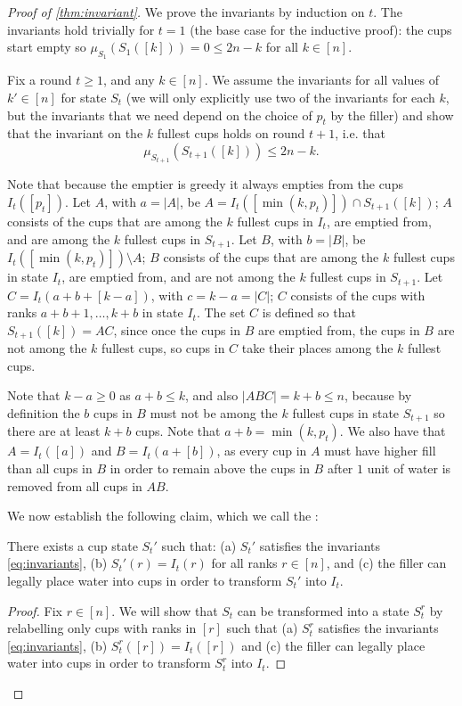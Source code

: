 \begin{proof}[Proof of \cref{thm:invariant}]
We prove the invariants by induction on $t$.
The invariants hold trivially for $t=1$ (the base case for the inductive proof): 
the cups start empty so $\mu_{S_1}(S_1([k])) = 0 \le 2n-k$ for all $k \in [n]$.

Fix a round $t \ge 1$, and any $k \in [n]$. We assume the invariants for all
values of $k' \in[n]$ for state $S_t$ (we will only explicitly use two of the
invariants for each $k$, but the invariants that we need depend on the
choice of $p_t$ by the filler) and show that
the invariant on the $k$ fullest cups holds on round $t+1$, i.e. that
$$\mu_{S_{t+1}}(S_{t+1}([k])) \le 2n-k.$$

Note that because the emptier is greedy it always empties from the cups
$I_t([p_t])$. Let $A$, with $a=|A|$, be $A = I_t([\min(k, p_t)]) \cap
S_{t+1}([k])$; $A$ consists of the cups that are among the $k$ fullest cups in
$I_t$, are emptied from, and are among the $k$ fullest cups in $S_{t+1}$. Let
$B$, with $b=|B|$, be $I_t([\min(k, p_t)]) \setminus A$; $B$ consists of the
cups that are among the $k$ fullest cups in state $I_t$, are emptied from, and
are not among the $k$ fullest cups in $S_{t+1}$. Let $C = I_t(a+b+[k-a])$, with
$c=k-a = |C|$; $C$ consists of the cups with ranks $a + b + 1, \ldots, k + b$
in state $I_t$. The set $C$ is defined so that $S_{t+1}([k]) = AC$, since once
the cups in $B$ are emptied from, the cups in $B$ are not among the $k$ fullest
cups, so cups in $C$ take their places among the $k$ fullest cups.

Note that $k-a \ge 0$ as $a+b \le k$, and also $|ABC| = k+b \le n$, because by
definition the $b$ cups in $B$ must not be among the $k$ fullest cups in state
$S_{t+1}$ so there are at least $k+b$ cups. 
Note that $a + b = \min(k, p_t)$. We also have that $A = I_t([a])$ and $B =
I_t(a+[b])$, as every cup in $A$ must have higher fill than all cups in $B$ in
order to remain above the cups in $B$ after $1$ unit of water is removed from
all cups in $AB$.

We now establish the following claim, which we call the :
\begin{clm}
  \label{clm:interchangable}
  There exists a cup state $S_t'$ such that: (a) $S_t'$ satisfies the
  invariants \eqref{eq:invariants}, (b) $S_t'(r) = I_t(r)$ for all ranks
  $r\in[n]$, and (c) the filler can legally place water into cups in order to
  transform $S_t'$ into $I_t$. 
\end{clm}
\begin{proof}
  Fix $r \in [n]$. We will show that $S_t$ can be transformed into a state
  $S_t^r$ by relabelling only cups with ranks in $[r]$ such that (a) $S_t^r$
  satisfies the invariants \eqref{eq:invariants}, (b) $S_t^r([r]) = I_t([r])$
  and (c) the filler can legally place water into cups in order to transform
  $S_t^r$ into $I_t$.


\end{proof}
\end{proof}
